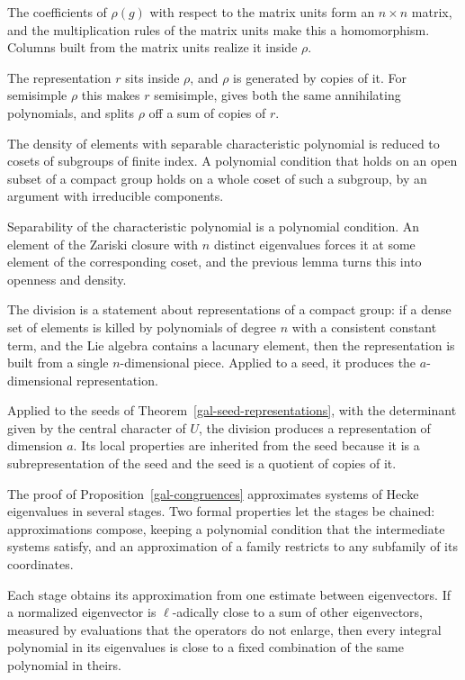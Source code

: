 The coefficients of $\rho(g)$ with respect to the matrix units form an $n\times n$ matrix, and the
multiplication rules of the matrix units make this a homomorphism. Columns built from the matrix units
realize it inside $\rho$.

The representation $r$ sits inside $\rho$, and $\rho$ is generated by copies of it. For semisimple
$\rho$ this makes $r$ semisimple, gives both the same annihilating polynomials, and splits $\rho$ off a
sum of copies of $r$.

The density of elements with separable characteristic polynomial is reduced to cosets of subgroups of
finite index. A polynomial condition that holds on an open subset of a compact group holds on a whole
coset of such a subgroup, by an argument with irreducible components.

Separability of the characteristic polynomial is a polynomial condition. An element of the Zariski
closure with $n$ distinct eigenvalues forces it at some element of the corresponding coset, and the
previous lemma turns this into openness and density.

The division is a statement about representations of a compact group: if a dense set of elements is
killed by polynomials of degree $n$ with a consistent constant term, and the Lie algebra contains a
lacunary element, then the representation is built from a single $n$-dimensional piece. Applied to a
seed, it produces the $a$-dimensional representation.

Applied to the seeds of Theorem~\ref{gal-seed-representations}, with the determinant given by the
central character of $U$, the division produces a representation of dimension $a$. Its local properties
are inherited from the seed because it is a subrepresentation of the seed and the seed is a quotient of
copies of it.

The proof of Proposition~\ref{gal-congruences} approximates systems of Hecke eigenvalues in several
stages. Two formal properties let the stages be chained: approximations compose, keeping a polynomial
condition that the intermediate systems satisfy, and an approximation of a family restricts to any
subfamily of its coordinates.

Each stage obtains its approximation from one estimate between eigenvectors. If a normalized eigenvector
is $\ell$-adically close to a sum of other eigenvectors, measured by evaluations that the operators do not
enlarge, then every integral polynomial in its eigenvalues is close to a fixed combination of the same
polynomial in theirs.

